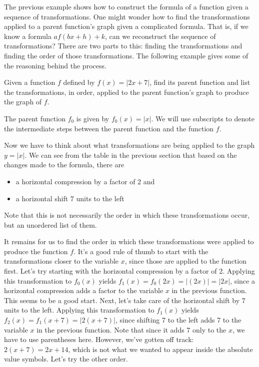 \documentclass[handout, noauthor, nooutcomes]{ximera}
\begin{document}
The previous example shows how to construct the formula of a function given a sequence of transformations. One might wonder how to find the transformations applied to a parent function's graph given a complicated formula. That is, if we know a formula $af(bx + h) + k$, can we reconstruct the sequence of transformations? There are two parts to this: finding the transformations and finding the order of those transformations. The following example gives some of the reasoning behind the process. 

\begin{example}
Given a function $f$ defined by $f(x) = |2x + 7|$, find its parent function and list the transformations, in order, applied to the parent function's graph to produce the graph of $f$. 
\begin{explanation}
The parent function $f_0$ is given by $f_0(x) = |x|$. We will use subscripts to denote the intermediate steps between the parent function and the function $f$. 

Now we have to think about what transformations are being applied to the graph $y = |x|$. We can see from the table in the previous section that based on the changes made to the formula, there are 
\begin{itemize}
\item a horizontal compression by a factor of 2 and
\item a horizontal shift 7 units to the left
\end{itemize}
Note that this is not necessarily the order in which these transformations occur, but an unordered list of them. 

It remains for us to find the order in which these transformations were applied to produce the function $f$. It's a good rule of thumb to start with the transformations closer to the variable $x$, since those are applied to the function first. Let's try starting with the horizontal compression by a factor of 2. Applying this transformation to $f_0(x)$ yields $f_1(x) = f_0(2x) = |(2x)| = |2x|$, since a horizontal compression adds a factor to the variable $x$ in the previous function. This seems to be a good start. Next, let's take care of the horizontal shift by 7 units to the left. Applying this transformation to $f_1(x)$ yields $f_2(x) = f_1(x + 7) = |2(x + 7)|$, since shifting 7 to the left adds 7 to the variable $x$ in the previous function. Note that since it adds 7 only to the $x$, we have to use parentheses here. However, we've gotten off track: $2(x + 7) = 2x + 14$, which is not what we wanted to appear inside the absolute value symbols. Let's try the other order.


\end{explanation}
\end{example}
\end{document}
